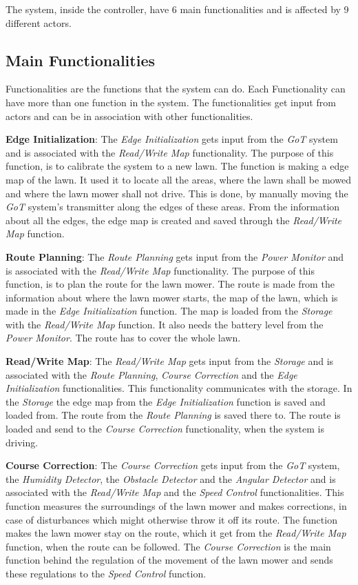 \noindent
\newpage

The system, inside the controller, have 6 main functionalities and is affected by 9 different actors.

\subsection{Main Functionalities}

Functionalities are the functions that the system can do. Each Functionality can have more than one function in the system. The functionalities get input from actors and can be in association with other functionalities. 

\textbf{Edge Initialization}:
The \textit{Edge Initialization} gets input from the \textit{GoT} system and is associated with the \textit{Read/Write Map} functionality. The purpose of this function, is to calibrate the system to a new lawn. The function is making a edge map of the lawn. It used it to locate all the areas, where the lawn shall be mowed and where the lawn mower shall not drive. This is done, by manually moving the \textit{GoT} system's transmitter  along the edges of these areas. From the information about all the edges, the edge map is created and saved through the \textit{Read/Write Map} function.

\textbf{Route Planning}:
The \textit{Route Planning} gets input from the \textit{Power Monitor} and is associated with the \textit{Read/Write Map} functionality. The purpose of this function, is to plan the route for the lawn mower. The route is made from the information about where the lawn mower starts, the map of the lawn, which is made in the \textit{Edge Initialization} function. The map is loaded from the \textit{Storage} with the \textit{Read/Write Map} function. It also needs the battery level from the \textit{Power Monitor}. The route has to cover the whole lawn.

\textbf{Read/Write Map}:
The \textit{Read/Write Map} gets input from the \textit{Storage} and is associated with the \textit{Route Planning}, \textit{Course Correction} and the \textit{Edge Initialization} functionalities. This functionality communicates with the storage. In the \textit{Storage} the edge map from the \textit{Edge Initialization} function is saved and loaded from. The route from the \textit{Route Planning} is saved there to. The route is loaded and send to the \textit{Course Correction} functionality, when the system is driving.

\textbf{Course Correction}:
The \textit{Course Correction} gets input from the \textit{GoT} system, the \textit{Humidity Detector}, the \textit{Obstacle Detector} and the \textit{Angular Detector} and is associated with the \textit{Read/Write Map} and the \textit{Speed Control} functionalities. This function measures the surroundings of the lawn mower and makes corrections, in case of disturbances which might otherwise throw it off its route. The function makes the lawn mower stay on the route, which it get from the \textit{Read/Write Map} function, when the route can be followed. The \textit{Course Correction} is the main function behind the regulation of the movement of the lawn mower and sends these regulations to the \textit{Speed Control} function.


